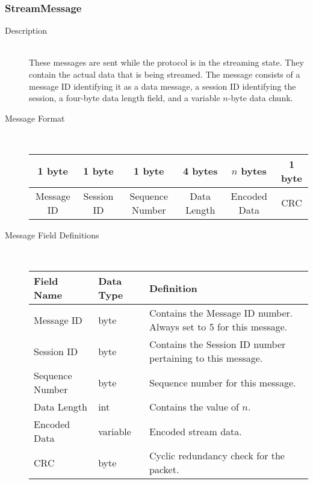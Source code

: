 \documentclass[12pt,letterpaper,titlepage]{article}
\begin{document}
\subsubsection{StreamMessage}
	\begin{description}
	\item[Description] \hfill \\
		These messages are sent while the protocol is in the streaming state. They contain the 
		actual data that is being streamed. The message consists of a message ID identifying it as a data message, a session ID identifying the session, a four-byte data length field, and a variable $n$-byte data chunk.
	\item[Message Format] \hfill \\
	\begin{tabular}{ | c | c | c | c | c | c | }
		\hline
		1 byte & 1 byte & 1 byte & 4 bytes & $n$ bytes & 1 byte \\
		\hline
		Message ID & Session ID & Sequence Number & Data Length & Encoded Data & CRC \\
		\hline
	\end{tabular}
	\item[Message Field Definitions] \hfill \\
	\begin{tabular}{ | p{3cm} | p{1.5cm} | p{8cm} | }
		\hline
		Field Name & Data Type & Definition \\
		\hline
		Message ID & byte & Contains the Message ID number. 
					\newline Always set to 5 for this message. \\
		\hline
		Session ID & byte & Contains the Session ID number pertaining to this message. \\
        \hline
        Sequence Number & byte & Sequence number for this message. \\
		\hline
		Data Length & int & Contains the value of $n$. \\
		\hline
        Encoded Data & variable & Encoded stream data. \\
        \hline
        CRC & byte & Cyclic redundancy check for the packet. \\
        \hline
	\end{tabular}
	\end{description}
\end{document}
